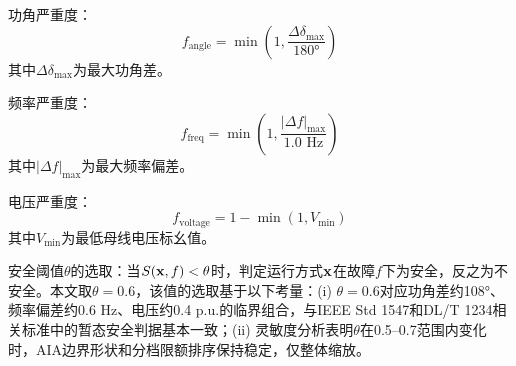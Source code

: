 功角严重度：
\begin{equation}
    f_{\text{angle}} = \min\left(1, \frac{\Delta\delta_{\max}}{180°}\right)
    \label{eq:f_angle}
\end{equation}
其中$\Delta\delta_{\max}$为最大功角差。

频率严重度：
\begin{equation}
    f_{\text{freq}} = \min\left(1, \frac{|\Delta f|_{\max}}{1.0 \text{ Hz}}\right)
    \label{eq:f_freq}
\end{equation}
其中$|\Delta f|_{\max}$为最大频率偏差。

电压严重度：
\begin{equation}
    f_{\text{voltage}} = 1 - \min(1, V_{\min})
    \label{eq:f_voltage}
\end{equation}
其中$V_{\min}$为最低母线电压标幺值。

安全阈值$\theta$的选取：当$S(\mathbf{x}, f) < \theta$时，判定运行方式$\mathbf{x}$在故障$f$下为安全，反之为不安全。本文取$\theta = 0.6$，该值的选取基于以下考量：(i) $\theta = 0.6$对应功角差约108°、频率偏差约0.6 Hz、电压约0.4 p.u.的临界组合，与IEEE Std 1547和DL/T 1234相关标准中的暂态安全判据基本一致；(ii) 灵敏度分析表明$\theta$在0.5--0.7范围内变化时，AIA边界形状和分档限额排序保持稳定，仅整体缩放。
